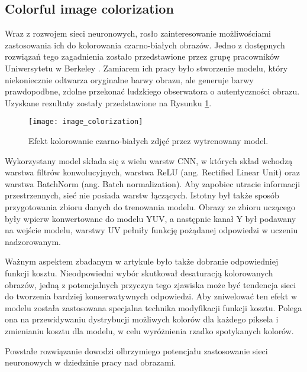   \subsection{Colorful image colorization}

    Wraz z rozwojem sieci neuronowych, rosło zainteresowanie możliwościami zastosowania
    ich do kolorowania czarno-białych obrazów. Jedno z dostępnych rozwiązań tego
    zagadnienia zostało przedstawione przez grupę pracowników Uniwersytetu w
    Berkeley \cite{colorful_image_colorization}. Zamiarem ich pracy było stworzenie
    modelu, który niekoniecznie odtwarza oryginalne barwy obrazu, ale generuje
    barwy prawdopodbne, zdolne przekonać ludzkiego obserwatora o autentyczności
    obrazu. Uzyskane rezultaty zostały przedstawione na
    Rysunku \ref{fig:colorful_image_colorization}.

    \begin{figure}[ht]
      \centering
      \texttt{[image: image\_colorization]}
      \caption{Efekt kolorowanie czarno-białych zdjęć przez wytrenowany model.}
      \label{fig:colorful_image_colorization}
    \end{figure}

    Wykorzystany model składa się z wielu warstw CNN, w których skład wchodzą
    warstwa filtrów konwolucyjnych, warstwa ReLU (ang. Rectified
    Linear Unit) oraz warstwa BatchNorm (ang. Batch normalization).
    Aby zapobiec utracie informacji przestrzennych, sieć nie posiada warstw łączących.
    Istotny był także sposób
    przygotowania zbioru danych do trenowania modelu. Obrazy ze zbioru uczącego
    były wpierw konwertowane do modelu YUV, a następnie kanał Y był podawany na
    wejście modelu, warstwy UV pełniły funkcję pożądanej odpowiedzi w uczeniu
    nadzorowanym.

    Ważnym aspektem zbadanym w artykule było także dobranie odpowiedniej
    funkcji kosztu. Nieodpowiedni wybór skutkował desaturacją kolorowanych
    obrazów, jedną z potencjalnych przyczyn tego zjawiska może być tendencja
    sieci do tworzenia bardziej konserwatywnych odpowiedzi. Aby zniwelować ten
    efekt w modelu została zastosowana specjalna technika modyfikacji
    funkcji kosztu. Polega ona na przewidywaniu dystrybucji możliwych kolorów
    dla każdego piksela i zmienianiu kosztu dla modelu, w celu wyróżnienia rzadko
    spotykanych kolorów.

    Powstałe rozwiązanie dowodzi olbrzymiego potencjału zastosowanie sieci
    neuronowych w dziedzinie pracy nad obrazami.

